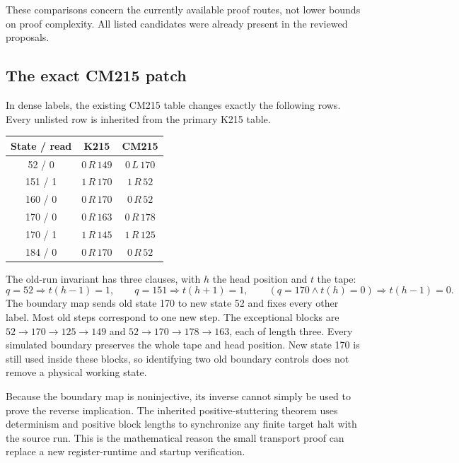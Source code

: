\documentclass[11pt,letterpaper]{article}
\theoremstyle{definition}\newtheorem{definition}[theorem]{Definition}
\begin{document}
\begin{samepage}
These comparisons concern the currently available proof routes, not lower
bounds on proof complexity. All listed candidates were already present in
the reviewed proposals.

\subsection{The exact CM215 patch}

In dense labels, the existing CM215 table changes exactly the following rows.
Every unlisted row is inherited from the primary K215 table.
\begin{center}
\begin{tabular}{ccc}
\toprule
State / read & K215 & CM215\\\midrule
52 / 0 & $0\,R\,149$ & $0\,L\,170$\\
151 / 1 & $1\,R\,170$ & $1\,R\,52$\\
160 / 0 & $0\,R\,170$ & $0\,R\,52$\\
170 / 0 & $0\,R\,163$ & $0\,R\,178$\\
170 / 1 & $1\,R\,145$ & $1\,R\,125$\\
184 / 0 & $0\,R\,170$ & $0\,R\,52$\\
\bottomrule
\end{tabular}
\end{center}
\end{samepage}
The old-run invariant has three clauses, with $h$ the head position and $t$ the
tape:
\[
 q=52\Rightarrow t(h-1)=1,\qquad
 q=151\Rightarrow t(h+1)=1,\qquad
 (q=170\land t(h)=0)\Rightarrow t(h-1)=0.
\]
The boundary map sends old state 170 to new state 52 and fixes every other
label. Most old steps correspond to one new step. The exceptional blocks are
$52\to170\to125\to149$ and $52\to170\to178\to163$, each of length three.
Every simulated boundary preserves the whole tape and head position.
New state 170 is still used inside these blocks, so identifying two old
boundary controls does not remove a physical working state.

Because the boundary map is noninjective, its inverse cannot simply be used to
prove the reverse implication. The inherited positive-stuttering theorem uses
determinism and positive block lengths to synchronize any finite target halt
with the source run. This is the mathematical reason the small transport proof
can replace a new register-runtime and startup verification.
\end{document}
